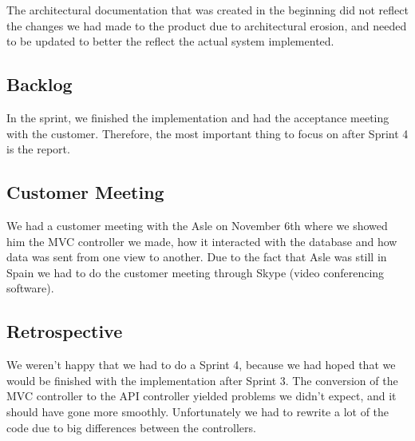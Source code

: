 The architectural documentation that was created in the beginning did not reflect the changes we had made to the product due to architectural erosion, and needed to be updated to better the reflect the actual system implemented.

\subsection{Backlog}
In the sprint, we finished the implementation and had the acceptance meeting with the customer. Therefore, the most important thing to focus on after Sprint 4 is the report.

\subsection{Customer Meeting}
We had a customer meeting with the Asle on November 6th where we showed him the MVC controller we made, how it interacted with the database and how data was sent from one view to another. Due to the fact that Asle was still in Spain we had to do the customer meeting through Skype (video conferencing software).

\subsection{Retrospective}
We weren't happy that we had to do a Sprint 4, because we had hoped that we would be finished with the implementation after Sprint 3. The conversion of the MVC controller to the API controller yielded problems we didn't expect, and it should have gone more smoothly. Unfortunately we had to rewrite a lot of the code due to big differences between the controllers.